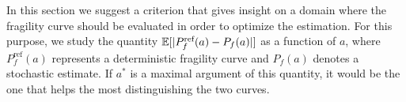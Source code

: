     
    In this section we suggest a criterion that gives insight on a domain where the
    fragility curve should be evaluated in order to optimize the estimation.
    {For this purpose, we study the quantity $\mathbb{E}[ |P^{\text{ref}}_f(a)-P_f(a)| ]$ as a function of $a$, where $P^{\text{ref}}_f(a)$ represents a deterministic fragility curve and $P_f(a)$ denotes a stochastic estimate.
    If $a^\ast$ is a maximal argument of this quantity, it would 
    be the one that helps the most distinguishing the two curves.}
    
    
    
    
    
